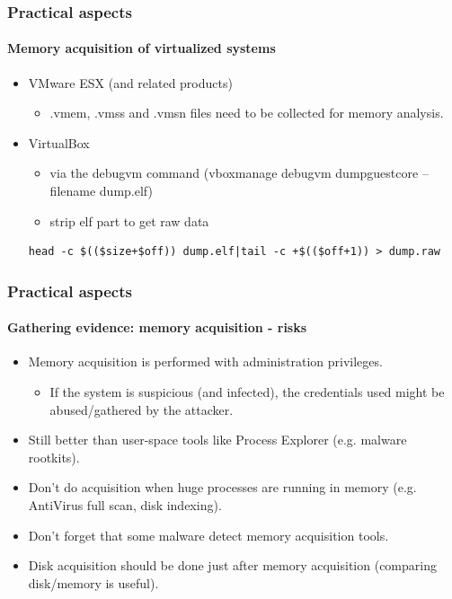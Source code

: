 \begin{frame}[fragile]
\frametitle{Practical aspects}
\framesubtitle{Memory acquisition of virtualized systems}
\begin{itemize}
\item VMware ESX (and related products)
\begin{itemize}
\item .vmem, .vmss and .vmsn files need to be collected for memory analysis.
\end{itemize}
\item VirtualBox
\begin{itemize}
\item via the debugvm command (vboxmanage debugvm dumpguestcore --filename dump.elf)
\item strip elf part to get raw data
\end{itemize}
\begin{lstlisting}
head -c $(($size+$off)) dump.elf|tail -c +$(($off+1)) > dump.raw
\end{lstlisting}
\end{itemize}

\end{frame}

\begin{frame}[fragile]
\frametitle{Practical aspects}
\framesubtitle{Gathering evidence: memory acquisition - risks}
\begin{itemize}
\item Memory acquisition is performed with administration privileges.
\begin{itemize}
\item If the system is suspicious (and infected), the credentials used might be abused/gathered by the attacker.
\end{itemize}
\item Still better than user-space tools like Process Explorer (e.g. malware rootkits).
\item Don't do acquisition when huge processes are running in memory (e.g. AntiVirus full scan, disk indexing).
\item Don't forget that some malware detect memory acquisition tools.
\item Disk acquisition should be done just after memory acquisition (comparing disk/memory is useful).
\end{itemize}
\end{frame}

